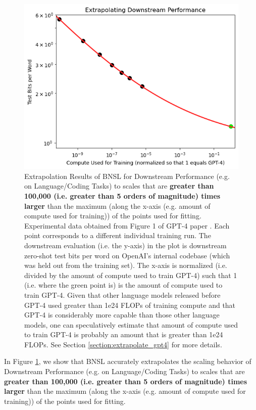 \documentclass{article} %
\begin{document}
\begin{figure}[htbp]
    \centering
\includegraphics[width=1.0\textwidth]{figures/gpt-4/gpt-4.png}

    \caption{
Extrapolation Results of BNSL for Downstream Performance (e.g. on Language/Coding Tasks) to scales that are \textbf{greater than 100,000 (i.e. greater than 5 orders of magnitude) times larger} than the maximum (along the x-axis (e.g. amount of compute used for training)) of the points used for fitting. Experimental data obtained from Figure 1 of GPT-4 paper \citep{OpenAI2023GPT4TR}. Each point corresponds to a different individual training run. The downstream evaluation (i.e. the y-axis) in the plot is downstream zero-shot test bits per word on OpenAI's internal codebase (which was held out from the training set). The x-axis is normalized (i.e. divided by the amount of compute used to train GPT-4) such that 1 (i.e. where the green point is) is the amount of compute used to train GPT-4. Given that other language models released before GPT-4 used greater than 1e24 FLOPs of training compute and that GPT-4 is considerably more capable than those other language models, one can speculatively estimate that amount of compute used to train GPT-4 is probably an amount that is greater than 1e24 FLOPs. See Section \ref{section:extrapolate_gpt4} for more details.
    }
    \label{fig:extrapolate_gpt4}
\end{figure}

In Figure \ref{fig:extrapolate_gpt4}, we show that BNSL accurately extrapolates the scaling behavior of Downstream Performance (e.g. on Language/Coding Tasks) to scales that are \textbf{greater than 100,000 (i.e. greater than 5 orders of magnitude) times larger} than the maximum (along the x-axis (e.g. amount of compute used for training)) of the points used for fitting.
\end{document}
